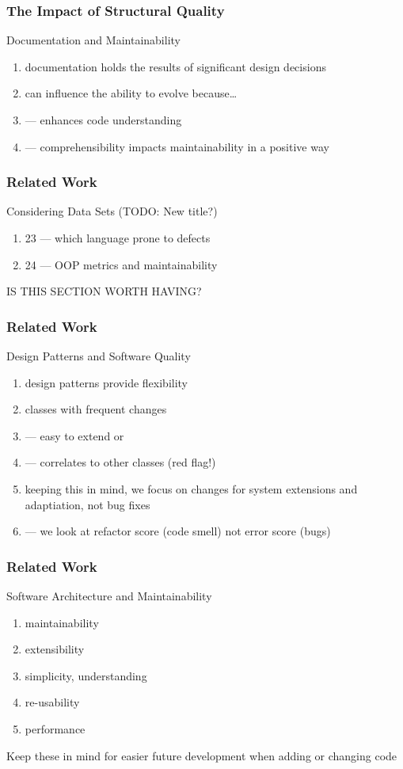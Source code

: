 \documentclass{beamer}
\begin{document}
\begin{frame}
  \frametitle{The Impact of Structural Quality}
  Documentation and Maintainability
  \begin{enumerate}
    \item documentation holds the results of significant design decisions
    \item can influence the ability to evolve because\dots
    \item --- enhances code understanding
    \item --- comprehensibility impacts maintainability in a positive way
  \end{enumerate}
\end{frame}

\begin{frame}
  \frametitle{Related Work}
  Considering Data Sets (TODO: New title?)
  \begin{enumerate}
    \item 23 --- which language prone to defects
    \item 24 --- OOP metrics and maintainability
  \end{enumerate}
  IS THIS SECTION WORTH HAVING?
\end{frame}

\begin{frame}
  \frametitle{Related Work}
  Design Patterns and Software Quality
  \begin{enumerate}
    \item design patterns provide flexibility
    \item classes with frequent changes
    \item --- easy to extend or
    \item --- correlates to other classes (red flag!)
    \item keeping this in mind, we focus on changes for system extensions and adaptiation, not bug fixes
    \item --- we look at refactor score (code smell) not error score (bugs)
  \end{enumerate}
\end{frame}

\begin{frame}
  \frametitle{Related Work}
  Software Architecture and Maintainability
  \begin{enumerate}
    \item maintainability
    \item extensibility
    \item simplicity, understanding
    \item re-usability
    \item performance
  \end{enumerate}
  Keep these in mind for easier future development when adding or changing code
\end{frame}
\end{document}
